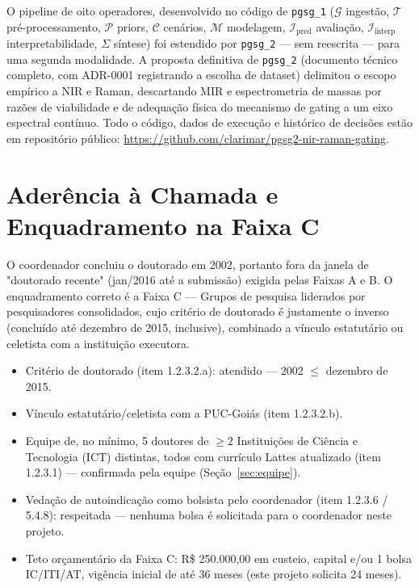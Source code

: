 \documentclass[11pt,a4paper]{article}
\begin{document}
O pipeline de oito operadores, desenvolvido no código de \texttt{pgsg\_1} ($\mathcal{G}$ ingestão, $\mathcal{T}$ pré-processamento, $\mathcal{P}$ priors, $\mathcal{C}$ cenários, $\mathcal{M}$ modelagem, $\mathcal{I}_{\text{pred}}$ avaliação, $\mathcal{I}_{\text{interp}}$ interpretabilidade, $\Sigma$ síntese) foi estendido por \texttt{pgsg\_2} --- sem reescrita --- para uma segunda modalidade. A proposta definitiva de \texttt{pgsg\_2} (documento técnico completo, com ADR-0001 registrando a escolha de dataset) delimitou o escopo empírico a NIR e Raman, descartando MIR e espectrometria de massas por razões de viabilidade e de adequação física do mecanismo de gating a um eixo espectral contínuo. Todo o código, dados de execução e histórico de decisões estão em repositório público: \url{https://github.com/clarimar/pgsg2-nir-raman-gating}.

\section{Aderência à Chamada e Enquadramento na Faixa C}

O coordenador concluiu o doutorado em 2002, portanto fora da janela de "doutorado recente" (jan/2016 até a submissão) exigida pelas Faixas A e B. O enquadramento correto é a Faixa C --- Grupos de pesquisa liderados por pesquisadores consolidados, cujo critério de doutorado é justamente o inverso (concluído até dezembro de 2015, inclusive), combinado a vínculo estatutário ou celetista com a instituição executora.

\begin{itemize}
\item Critério de doutorado (item 1.2.3.2.a): atendido --- 2002 $\leq$ dezembro de 2015.
\item Vínculo estatutário/celetista com a PUC-Goiás (item 1.2.3.2.b).
\item Equipe de, no mínimo, 5 doutores de $\geq 2$ Instituições de Ciência e Tecnologia (ICT) distintas, todos com currículo Lattes atualizado (item 1.2.3.1) --- confirmada pela equipe (Seção~\ref{sec:equipe}).
\item Vedação de autoindicação como bolsista pelo coordenador (item 1.2.3.6 / 5.4.8): respeitada --- nenhuma bolsa é solicitada para o coordenador neste projeto.
\item Teto orçamentário da Faixa C: R\$ 250.000,00 em custeio, capital e/ou 1 bolsa IC/ITI/AT, vigência inicial de até 36 meses (este projeto solicita 24 meses).
\end{itemize}
\end{document}
